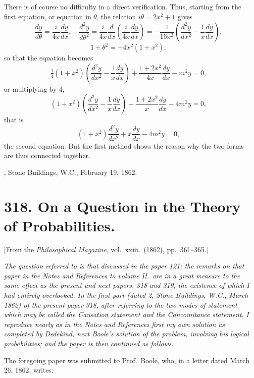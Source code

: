 \documentclass[11pt,a4paper]{article}
\theoremstyle{plain}
\begin{document}
There is of course no difficulty in a direct verification. Thus, starting from the first equation, or equation in $\theta$, the relation $i\theta = 2x^2 + 1$ gives
\[
\frac{dy}{d\theta} = \frac{i}{4x}\frac{dy}{dx}, \quad \frac{d^2y}{d\theta^2} = \frac{i}{4x}\frac{d}{dx}\!\left(\frac{i}{4x}\frac{dy}{dx}\right) = -\frac{1}{16x^2}\!\left(\frac{d^2y}{dx^2} - \frac{1}{x}\frac{dy}{dx}\right),
\]
\[
1 + \theta^2 = -4x^2(1+x^2);
\]
so that the equation becomes
\[
\tfrac{1}{4}(1+x^2)\!\left(\frac{d^2y}{dx^2} - \frac{1}{x}\frac{dy}{dx}\right) + \frac{1+2x^2}{4x}\frac{dy}{dx} - m^2 y = 0,
\]
or multiplying by 4,
\[
(1+x^2)\!\left(\frac{d^2y}{dx^2} - \frac{1}{x}\frac{dy}{dx}\right) + \frac{1+2x^2}{x}\frac{dy}{dx} - 4m^2 y = 0,
\]
that is
\[
(1+x^2)\frac{d^2y}{dx^2} + x\frac{dy}{dx} - 4m^2 y = 0,
\]
the second equation. But the first method shows the reason why the two forms are thus connected together.

\medskip
{}, Stone Buildings, W.C., February 19, 1862.


\newpage
\section*{318. On a Question in the Theory of Probabilities.}

[From the \textit{Philosophical Magazine}, vol.\ xxiii.\ (1862), pp.\ 361--365.]

\medskip

\textit{The question referred to is that discussed in the paper 121; the remarks on that paper in the Notes and References to volume II.\ are in a great measure to the same effect as the present and next papers, 318 and 319, the existence of which I had entirely overlooked. In the first part (dated 2, Stone Buildings, W.C., March 1862) of the present paper 318, after referring to the two modes of statement which may be called the Causation statement and the Concomitance statement, I reproduce nearly as in the Notes and References first my own solution as completed by Dedekind, next Boole's solution of the problem, involving his logical probabilities; and the paper is then continued as follows.}

\medskip

The foregoing paper was submitted to Prof.\ Boole, who, in a letter dated March 26, 1862, writes:
\end{document}
